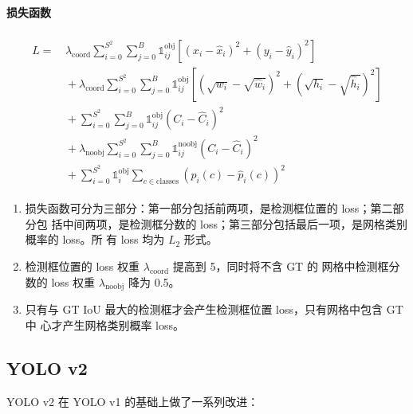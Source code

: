 \paragraph{损失函数}

\begin{align}
  \label{equ:yolo-v1-loss}
  \begin{split}
    L = & \, \lambda_{\mathrm{coord}} \sum_{i=0}^{S^2} \sum_{j=0}^{B} \mathds{1}_{ij}^{\mathrm{obj}} \left [ \left (x_i - \hat{x}_i \right )^2 + \left (y_i - \hat{y}_i \right )^2 \right ] \\
    & \, + \lambda_{\mathrm{coord}} \sum_{i=0}^{S^2} \sum_{j=0}^{B} \mathds{1}_{ij}^{\mathrm{obj}} \left [ \left(\sqrt{w_i} - \sqrt{\hat{w}_i} \right)^2 + \left (\sqrt{h_i} - \sqrt{\hat{h}_i} \right )^2 \right ]  \\
    & \, + \sum_{i=0}^{S^2} \sum_{j=0}^{B} \mathds{1}_{ij}^{\mathrm{obj}} \left( C_i - \hat{C}_i \right)^2  \\
    & \, + \lambda_{\mathrm{noobj}} \sum_{i=0}^{S^2} \sum_{j=0}^{B} \mathds{1}_{ij}^{\mathrm{noobj}} \left( C_i - \hat{C}_i \right)^2  \\
    & \, + \sum_{i=0}^{S^2} \mathds{1}_{i}^{\mathrm{obj}} \sum_{c \in \mathrm{classes}} \left( p_i(c) - \hat{p}_i(c) \right)^2
  \end{split}
\end{align}

\begin{enumerate}
  \item 损失函数可分为三部分：第一部分包括前两项，是检测框位置的 loss；第二部分包
    括中间两项，是检测框分数的 loss；第三部分包括最后一项，是网格类别概率的 loss。所
    有 loss 均为 $L_2$ 形式。
  \item 检测框位置的 loss 权重 $\lambda_{\mathrm{coord}}$ 提高到 5，同时将不含 GT 的
    网格中检测框分数的 loss 权重 $\lambda_{\mathrm{noobj}}$ 降为 0.5。
  \item 只有与 GT IoU 最大的检测框才会产生检测框位置 loss，只有网格中包含 GT 中
    心才产生网格类别概率 loss。
\end{enumerate}

\subsection{YOLO v2}
\label{subsec:YOLOv2}
YOLO v2 在 YOLO v1 的基础上做了一系列改进：

